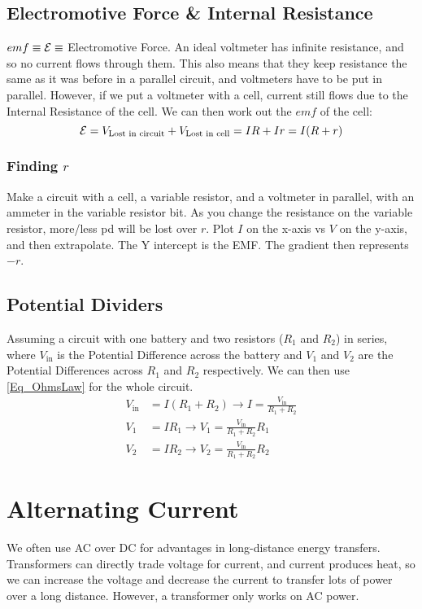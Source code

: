 \section{Electromotive Force \& Internal Resistance}
\(emf \equiv \mathcal{E} \equiv \) Electromotive Force.
An ideal voltmeter has infinite resistance, and so no current flows through them. This also means that they keep resistance the same as it was before in a parallel circuit, and voltmeters have to be put in parallel. However, if we put a voltmeter with a cell, current still flows due to the Internal Resistance of the cell. We can then work out the \(emf\) of the cell:
\[ \mathcal{E} = V_{\text{Lost in circuit}} + V_{\text{Lost in cell}} = IR + Ir = I(R+r) \]

\subsection{Finding \(r\)}
\begin{enumerate}
	\ii Make a circuit with a cell, a variable resistor, and a voltmeter in parallel, with an ammeter in the variable resistor bit.
	\ii As you change the resistance on the variable resistor, more/less pd will be lost over \(r\).
	\ii Plot \(I\) on the x-axis vs \(V\) on the y-axis, and then extrapolate. The Y intercept is the EMF. The gradient then represents \(-r\).
\end{enumerate}


\section{Potential Dividers}
Assuming a circuit with one battery and two resistors (\(R_1\) and \(R_2\)) in series, where \(V_\text{in}\) is the Potential Difference across the battery and \(V_1\) and \(V_2\) are the Potential Differences across \(R_1\) and \(R_2\) respectively. We can then use \eqref{Eq_OhmsLaw} for the whole circuit.
\begin{align*}
	V_\text{in} &= I(R_1 + R_2) \to I = \frac{V_\text{in}}{R_1 + R_2} \\
	V_1 &= IR_1 \to V_1 = \frac{V_\text{in}}{R_1+R_2}R_1 \\
	V_2 &= IR_2 \to V_2 = \frac{V_\text{in}}{R_1 + R_2}R_2
\end{align*}

\chapter{Alternating Current}
We often use AC over DC for advantages in long-distance energy transfers. Transformers can directly trade voltage for current, and current produces heat, so we can increase the voltage and decrease the current to transfer lots of power over a long distance. However, a transformer only works on AC power.


